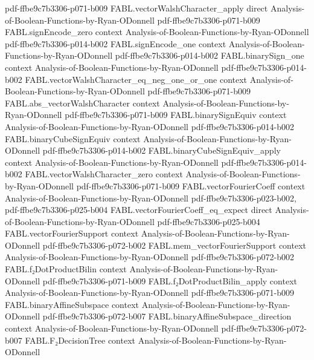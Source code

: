 \begin{theorem}
  {pdf-ffbe9c7b3306-p071-b009}
\proofstep
  {FABL.vectorWalshCharacter_apply}
  {direct}
  {Analysis-of-Boolean-Functions-by-Ryan-ODonnell}
  {pdf-ffbe9c7b3306-p071-b009}
\proofstep
  {FABL.signEncode_zero}
  {context}
  {Analysis-of-Boolean-Functions-by-Ryan-ODonnell}
  {pdf-ffbe9c7b3306-p014-b002}
\proofstep
  {FABL.signEncode_one}
  {context}
  {Analysis-of-Boolean-Functions-by-Ryan-ODonnell}
  {pdf-ffbe9c7b3306-p014-b002}
\proofstep
  {FABL.binarySign_one}
  {context}
  {Analysis-of-Boolean-Functions-by-Ryan-ODonnell}
  {pdf-ffbe9c7b3306-p014-b002}
\proofstep
  {FABL.vectorWalshCharacter_eq_neg_one_or_one}
  {context}
  {Analysis-of-Boolean-Functions-by-Ryan-ODonnell}
  {pdf-ffbe9c7b3306-p071-b009}
\proofstep
  {FABL.abs_vectorWalshCharacter}
  {context}
  {Analysis-of-Boolean-Functions-by-Ryan-ODonnell}
  {pdf-ffbe9c7b3306-p071-b009}
\proofstep
  {FABL.binarySignEquiv}
  {context}
  {Analysis-of-Boolean-Functions-by-Ryan-ODonnell}
  {pdf-ffbe9c7b3306-p014-b002}
\proofstep
  {FABL.binaryCubeSignEquiv}
  {context}
  {Analysis-of-Boolean-Functions-by-Ryan-ODonnell}
  {pdf-ffbe9c7b3306-p014-b002}
\proofstep
  {FABL.binaryCubeSignEquiv_apply}
  {context}
  {Analysis-of-Boolean-Functions-by-Ryan-ODonnell}
  {pdf-ffbe9c7b3306-p014-b002}
\proofstep
  {FABL.vectorWalshCharacter_zero}
  {context}
  {Analysis-of-Boolean-Functions-by-Ryan-ODonnell}
  {pdf-ffbe9c7b3306-p071-b009}
\proofstep
  {FABL.vectorFourierCoeff}
  {context}
  {Analysis-of-Boolean-Functions-by-Ryan-ODonnell}
  {pdf-ffbe9c7b3306-p023-b002,
    pdf-ffbe9c7b3306-p025-b004}
\proofstep
  {FABL.vectorFourierCoeff_eq_expect}
  {direct}
  {Analysis-of-Boolean-Functions-by-Ryan-ODonnell}
  {pdf-ffbe9c7b3306-p025-b004}
\proofstep
  {FABL.vectorFourierSupport}
  {context}
  {Analysis-of-Boolean-Functions-by-Ryan-ODonnell}
  {pdf-ffbe9c7b3306-p072-b002}
\proofstep
  {FABL.mem_vectorFourierSupport}
  {context}
  {Analysis-of-Boolean-Functions-by-Ryan-ODonnell}
  {pdf-ffbe9c7b3306-p072-b002}
\proofstep
  {FABL.f₂DotProductBilin}
  {context}
  {Analysis-of-Boolean-Functions-by-Ryan-ODonnell}
  {pdf-ffbe9c7b3306-p071-b009}
\proofstep
  {FABL.f₂DotProductBilin_apply}
  {context}
  {Analysis-of-Boolean-Functions-by-Ryan-ODonnell}
  {pdf-ffbe9c7b3306-p071-b009}
\proofstep
  {FABL.binaryAffineSubspace}
  {context}
  {Analysis-of-Boolean-Functions-by-Ryan-ODonnell}
  {pdf-ffbe9c7b3306-p072-b007}
\proofstep
  {FABL.binaryAffineSubspace_direction}
  {context}
  {Analysis-of-Boolean-Functions-by-Ryan-ODonnell}
  {pdf-ffbe9c7b3306-p072-b007}
\proofstep
  {FABL.F₂DecisionTree}
  {context}
  {Analysis-of-Boolean-Functions-by-Ryan-ODonnell}

\end{theorem}
